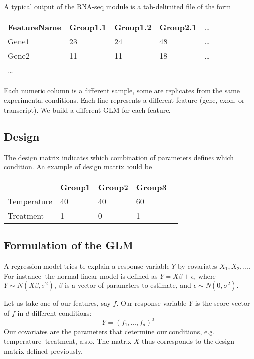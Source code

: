 \documentclass[a4paper,11pt]{article}
\begin{document}
A typical output of the RNA-seq module is a tab-delimited file of the form

\vspace{0.5 cm}
\begin{tabular}{lllll}
\textbf{FeatureName} & \textbf{Group1.1} & \textbf{Group1.2} & \textbf{Group2.1} & \ldots \\
Gene1       & 23       & 24       & 48       & \ldots \\
Gene2       & 11       & 11       & 18       & \ldots \\
\ldots
\end{tabular}
\vspace{0.5 cm}

Each numeric column is a different sample, some are replicates from the same experimental conditions. Each line represents a different feature (gene, exon, or transcript). We build a different GLM for each feature.

\subsection{Design}
The design matrix indicates which combination of parameters defines which condition. An example of design matrix could be

\vspace{0.5 cm}
\begin{tabular}{lllll}
             & \textbf{Group1} & \textbf{Group2} & \textbf{Group3}\\
Temperature  & 40       & 40       & 60 \\
Treatment    & 1        & 0        & 1  
\end{tabular}
\vspace{0.5 cm}

\subsection{Formulation of the GLM}

A regression model tries to explain a response variable $Y$ by covariates $X_1,X_2,\ldots$. For instance, the normal linear model is defined as $ Y = X\beta + \epsilon$, where $Y \sim N(X\beta,\sigma^2)$, $\beta$ is a vector of parameters to estimate, and $\epsilon \sim N(0,\sigma^2)$.

Let us take one of our features, say $f$. Our response variable $Y$ is the score vector of $f$ in $d$ different conditions:
$$ Y = (f_1,\ldots,f_d)^T $$
Our covariates are the parameters that determine our conditions, e.g. temperature, treatment, a.s.o. The matrix $X$ thus corresponds to the design matrix defined previously.
\end{document}
